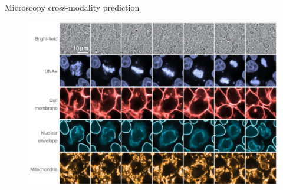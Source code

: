\documentclass[xcolor=pdftex,dvipsnames,table,mathserif]{beamer}
\newcommand{\source}[1]{\begin{textblock*}{4cm}(8.7cm,8.6cm)
    \begin{beamercolorbox}[ht=0.5cm,right]{framesource}
      \usebeamerfont{framesource}\usebeamercolor[fg]{framesource} Credits: {#1}
    \end{beamercolorbox}
\end{textblock*}}
\begin{document}



\begin{frame}{Microscopy cross-modality prediction\cite{ounkomol_label-free_2018}}

  \begin{figure}[ht]
    \centering
    \includegraphics[width=\textwidth]{microscopy_modality_pred}
  \end{figure}



\end{frame}
\end{document}

